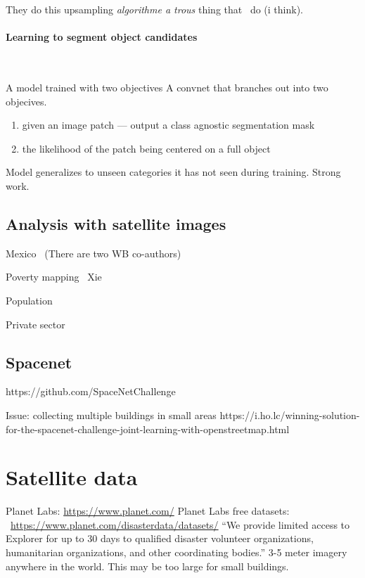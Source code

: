 \documentclass[12pt, a4paper, oneside, headinclude, footinclude]{article}
\begin{document}
They do this upsampling \textit{algorithme a trous} thing that~\cite{NIPS2015_5852}
do (i think).

\paragraph{Learning to segment object candidates}~\cite{NIPS2015_5852}

A model trained with two objectives
A convnet that branches out into two objecives.

\begin{enumerate}
    \item given an image patch ---  output a class agnostic segmentation mask
    \item the likelihood of the patch being centered on a full object
\end{enumerate}

Model generalizes to unseen categories it has not seen during training. Strong
work.

\subsection{Analysis with satellite images}

Mexico~\cite{babenko2017poverty} (There are two WB co-authors)

Poverty mapping~\cite{Jean790} Xie

Population~\cite{doupe2016, robinson2017}

Private sector~\cite{facebook, cnn_orbital}

\subsection{Spacenet}

https://github.com/SpaceNetChallenge

Issue: collecting multiple buildings in small areas
https://i.ho.lc/winning-solution-for-the-spacenet-challenge-joint-learning-with-openstreetmap.html

\section{Satellite data}

Planet Labs: \url{https://www.planet.com/}
Planet Labs free datasets:
~\url{https://www.planet.com/disasterdata/datasets/}
    ``We provide limited access to Explorer for up to 30 days to qualified disaster
    volunteer organizations, humanitarian organizations, and other coordinating
    bodies.''
3-5 meter imagery anywhere in the world. This may be too large for small
buildings.
\end{document}

